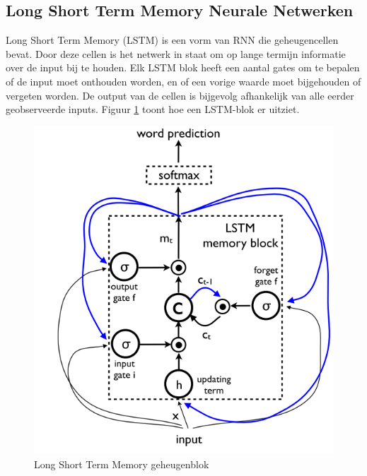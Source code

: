 
\subsection{Long Short Term Memory Neurale Netwerken}
\label{sub:lstm}
Long Short Term Memory (LSTM) is een vorm van RNN die geheugencellen bevat. Door deze cellen is het netwerk in staat om op lange termijn informatie over de input bij te houden. Elk LSTM blok heeft een aantal gates om te bepalen of de input moet onthouden worden, en of een vorige waarde moet bijgehouden of vergeten worden. De output van de cellen is bijgevolg afhankelijk van alle eerder geobserveerde inputs. Figuur \ref{fig:lstm} toont hoe een LSTM-blok er uitziet.\cite{Google}\cite{SeppHochreiter1997}

\begin{figure}[tb]
    \centering
    \includegraphics[width=\linewidth]{Images/lstm.PNG}
    \caption{Long Short Term Memory geheugenblok}
    \label{fig:lstm}
\end{figure}


